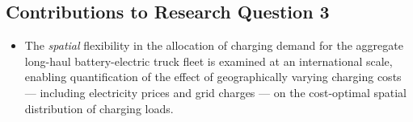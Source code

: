     \subsection{Contributions to Research Question 3}

    \begin{itemize}

         \item The \textit{spatial} flexibility in the allocation of charging demand for the aggregate long-haul battery-electric truck fleet is examined at an international scale, enabling quantification of the effect of geographically varying charging costs — including electricity prices and grid charges — on the cost-optimal spatial distribution of charging loads.
        
        

\end{itemize}
